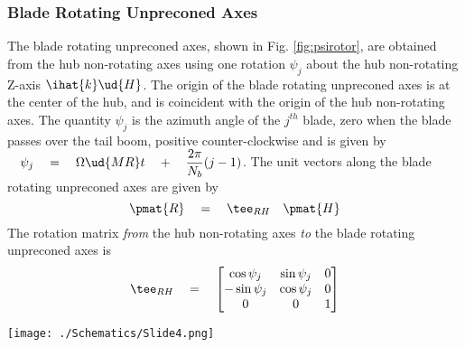 \subsubsection{Blade Rotating Unpreconed Axes}
\label{sec:brua}
The blade rotating unpreconed axes, shown in Fig. \ref{fig:psirotor}, are obtained from the hub non-rotating axes using one rotation $\psi_j$ about the hub non-rotating Z-axis $\ihat{k}\ud{H}$. The origin of the blade rotating unpreconed axes is at the center of the hub, and is coincident with the origin of the hub non-rotating axes. The quantity $\psi_j$ is the azimuth angle of the $j^{th}$ blade, zero when the blade passes over the tail boom, positive counter-clockwise and is given by $\displaystyle{\quad \psi_j \quad = \quad \Omega\ud{MR} t \quad + \quad \frac{2 \pi}{N_b} (j-1)}$. The unit vectors along the blade rotating unpreconed axes are given by
\begin{equation}
\pmat{R} \quad = \quad \tee_{RH} \quad \pmat{H}
\end{equation}
The rotation matrix \textit{from} the hub non-rotating axes \textit{to} the blade rotating unpreconed axes is
\begin{equation}
\label{eqn:TRH}
\tee_{RH} \quad = \quad \begin{bmatrix} \cos \psi_j & \sin \psi_j & 0 \\ -\sin \psi_j & \cos \psi_j & 0 \\ 0 & 0 & 1 \end{bmatrix}
\end{equation}
\begin{Figure}
 \centering
 \texttt{[image: ./Schematics/Slide4.png]}
 \vspace{-0.5cm}
 \label{fig:psirotor}
\end{Figure}
